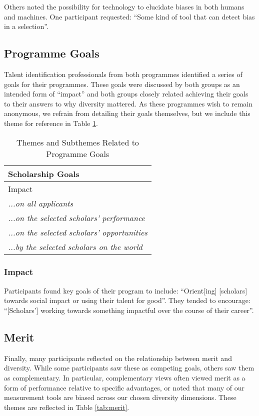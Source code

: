 Others noted the possibility for technology to elucidate biases in both humans and machines. One participant requested: ``Some kind of tool that can detect bias in a selection''.

\subsection{Programme Goals}
Talent identification professionals from both programmes identified a series of goals for their programmes. These goals were discussed by both groups as an intended form of ``impact'' and both groups closely related achieving their goals to their answers to why diversity mattered. As these programmes wish to remain anonymous, we refrain from detailing their goals themselves, but we include this theme for reference in Table \ref{tab:scholarshipgoals}.

\begin{table}[h]
    \centering
    \caption{Themes and Subthemes Related to Programme Goals}
    \label{tab:scholarshipgoals}
    \begin{tabular}{|l|}
        \hline
        \textbf{Scholarship Goals} \\
        \hline
        Impact \\
        \emph{...on all applicants} \\
        \emph{...on the selected scholars' performance} \\
        \emph{...on the selected scholars' opportunities} \\
        \emph{...by the selected scholars on the world} \\
        \hline
    \end{tabular}
\end{table}

\subsubsection{Impact}
Participants found key goals of their program to include: ``Orient[ing] [scholars] towards social impact or using their talent for good''. They tended to encourage: ``[Scholars'] working towards something impactful over the course of their career''.

\subsection{Merit}
Finally, many participants reflected on the relationship between merit and diversity. While some participants saw these as competing goals, others saw them as complementary. In particular, complementary views often viewed merit as a form of performance relative to specific advantages, or noted that many of our measurement tools are biased across our chosen diversity dimensions. These themes are reflected in Table \ref{tab:merit}.

